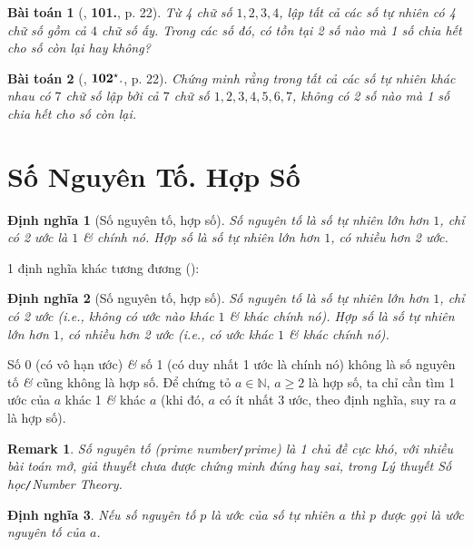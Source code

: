 \documentclass[oneside]{book}
\numberwithin{equation}{section}
\newtheorem{dinhnghia}{Định nghĩa}[section]
\newtheorem{baitoan}{Bài toán}[section]
\newtheorem{remark}{Remark}[section]
\begin{document}
\begin{baitoan}[\cite{Binh_Toan_6_tap_1}, \textbf{101.}, p. 22]
	Từ 4 chữ số $1,2,3,4$, lập tất cả các số tự nhiên có 4 chữ số gồm cả $4$ chữ số ấy. Trong các số đó, có tồn tại 2 số nào mà 1 số chia hết cho số còn lại hay không?
\end{baitoan}

\begin{baitoan}[\cite{Binh_Toan_6_tap_1}, $\bf 102^\star.$, p. 22]
	Chứng minh rằng trong tất cả các số tự nhiên khác nhau có $7$ chữ số lập bởi cả $7$ chữ số $1,2,3,4,5,6,7$, không có 2 số nào mà 1 số chia hết cho số còn lại.
\end{baitoan}


\section{Số Nguyên Tố. Hợp Số}

\begin{dinhnghia}[Số nguyên tố, hợp số]
	\emph{Số nguyên tố} là số tự nhiên lớn hơn $1$, chỉ có 2 ước là $1$ \textit{\&} chính nó. \emph{Hợp số} là số tự nhiên lớn hơn $1$, có nhiều hơn 2 ước.
\end{dinhnghia}
1 định nghĩa khác tương đương (\cite[\S5, p. 23]{Binh_Toan_6_tap_1}):

\begin{dinhnghia}[Số nguyên tố, hợp số]
	\emph{Số nguyên tố} là số tự nhiên lớn hơn $1$, chỉ có 2 ước (i.e., không có ước nào khác $1$ \& khác chính nó). \emph{Hợp số} là số tự nhiên lớn hơn $1$, có nhiều hơn 2 ước (i.e., có ước khác $1$ \& khác chính nó).
\end{dinhnghia}
Số 0 (có vô hạn ước) \textit{\&} số 1 (có duy nhất 1 ước là chính nó) không là số nguyên tố \textit{\&} cũng không là hợp số. Để chứng tỏ $a\in\mathbb{N}$, $a\ge 2$ là hợp số, ta chỉ cần tìm 1 ước của $a$ khác 1 \textit{\&} khác $a$ (khi đó, $a$ có ít nhất 3 ước, theo định nghĩa, suy ra $a$ là hợp số).

\begin{remark}
	Số nguyên tố (prime number\emph{\texttt{/}}prime) là 1 chủ đề cực khó, với nhiều bài toán mở, giả thuyết chưa được chứng minh đúng hay sai, trong Lý thuyết Số học\emph{\texttt{/}}Number Theory.
\end{remark}

\begin{dinhnghia}
	Nếu số nguyên tố $p$ là ước của số tự nhiên $a$ thì $p$ được gọi là \emph{ước nguyên tố} của $a$.
\end{dinhnghia}
\end{document}
